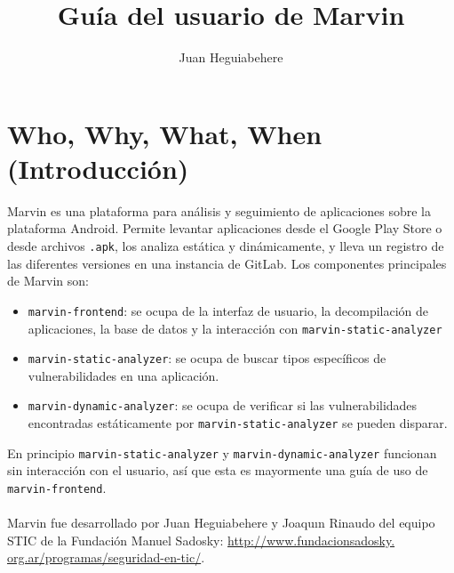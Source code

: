 \documentclass[11pt]{article}
\title{\textbf{Guía del usuario de Marvin}}
\author{Juan Heguiabehere}
\date{}
\begin{document}
\maketitle
\section{Who, Why, What, When (Introducción)}
Marvin es una plataforma para análisis y seguimiento de aplicaciones sobre la plataforma Android. Permite levantar aplicaciones desde el Google Play Store o desde archivos \texttt{.apk}, los analiza estática y dinámicamente, y lleva un registro de las diferentes versiones en una instancia de GitLab. Los componentes principales de Marvin son:
\begin{itemize}
\item \texttt{marvin-frontend}: se ocupa de la interfaz de usuario, la decompilación de aplicaciones, la base de datos y la interacción con \texttt{marvin-static-analyzer}
\item \texttt{marvin-static-analyzer}: se ocupa de buscar tipos específicos de vulnerabilidades en una aplicación. 
\item \texttt{marvin-dynamic-analyzer}: se ocupa de verificar si las vulnerabilidades encontradas estáticamente por \texttt{marvin-static-analyzer} se pueden disparar.
\end{itemize}
En principio \texttt{marvin-static-analyzer} y \texttt{marvin-dynamic-analyzer} funcionan sin interacción con el usuario, así que esta es mayormente una guía de uso de \texttt{marvin-frontend}.
\paragraph{} Marvin fue desarrollado por Juan Heguiabehere y Joaquın Rinaudo del equipo STIC de la Fundación Manuel Sadosky: \url{http://www.fundacionsadosky.
org.ar/programas/seguridad-en-tic/}.
\end{document}
